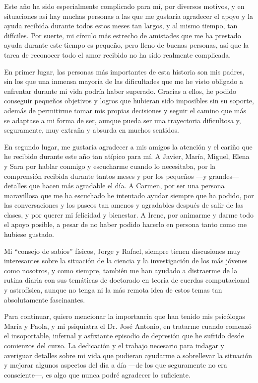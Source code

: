Este año ha sido especialmente complicado para mí, por diversos motivos, y en situaciones así hay muchas personas a las que me gustaría agradecer el apoyo y la ayuda recibida durante todos estos meses tan largos, y al mismo tiempo, tan difíciles. Por suerte, mi círculo más estrecho de amistades que me ha prestado ayuda durante este tiempo es pequeño, pero lleno de buenas personas, así que la tarea de reconocer todo el amor recibido no ha sido realmente complicada. 

En primer lugar, las personas más importantes de esta historia son mis padres, sin los que una inmensa mayoría de las dificultades que me he visto obligado a enfrentar durante mi vida podría haber superado. Gracias a ellos, he podido conseguir pequeños objetivos y logros que hubieran sido imposibles sin su soporte, además de permitirme tomar mis propias decisiones y seguir el camino que más se adaptase a mi forma de ser, aunque pueda ser una trayectoria dificultosa y, seguramente, muy extraña y absurda en muchos sentidos.

En segundo lugar, me gustaría agradecer a mis amigos la atención y el cariño que he recibido durante este año tan atípico para mí. A Javier, María, Miguel, Elena y Sara por hablar conmigo y escucharme cuando lo necesitaba, por la comprensión recibida durante tantos meses y por los pequeños ---y grandes--- detalles que hacen más agradable el día. A Carmen, por ser una persona maravillosa que me ha escuchado he intentado ayudar siempre que ha podido, por las conversaciones y los paseos tan amenos y agradables después de salir de las clases, y por querer mi felicidad y bienestar. A Irene, por animarme y darme todo el apoyo posible, a pesar de no haber podido hacerlo en persona tanto como me hubiese gustado.

Mi \enquote{consejo de sabios} físicos, Jorge y Rafael, siempre tienen discusiones muy interesantes sobre la situación de la ciencia y la investigación de los más jóvenes como nosotros, y como siempre, también me han ayudado a distraerme de la rutina diaria con sus temáticas de doctorado en teoría de cuerdas computacional y astrofísica, aunque no tenga ni la más remota idea de estos temas tan absolutamente fascinantes. 

Para continuar, quiero mencionar la importancia que han tenido mis psicólogas María y Paola, y mi psiquiatra el Dr. José Antonio, en tratarme cuando comenzó el insoportable, infernal y asfixiante episodio de depresión que he sufrido desde comienzos del curso. La dedicación y el trabajo necesario para indagar y averiguar detalles sobre mi vida que pudieran ayudarme a sobrellevar la situación y mejorar algunos aspectos del día a día ---de los que seguramente no era consciente---, es algo que nunca podré agradecer lo suficiente.

